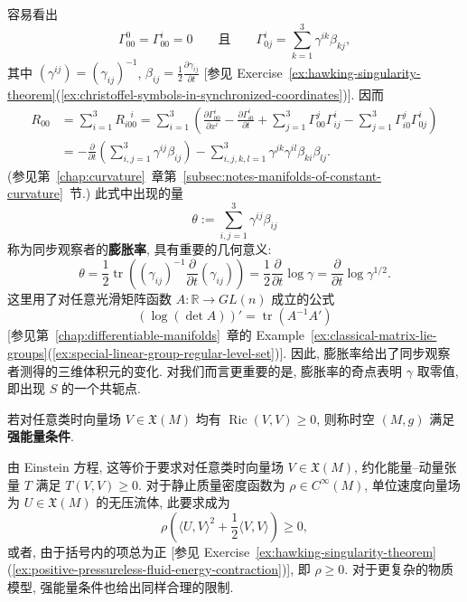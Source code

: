 容易看出
\[
  \Gamma_{00}^0=\Gamma_{00}^i=0
  \qquad\text{且}\qquad
  \Gamma_{0j}^i=\sum_{k=1}^3\gamma^{ik}\beta_{kj},
\]
其中 $(\gamma^{ij})=(\gamma_{ij})^{-1}$, $\beta_{ij}=\frac{1}{2}\frac{\partial\gamma_{ij}}{\partial t}$ [参见 Exercise~\ref{ex:hawking-singularity-theorem}(\ref{ex:christoffel-symbols-in-synchronized-coordinates})]. 因而
\begin{align*}
  R_{00}
  &=\sum_{i=1}^3R_{i00}^{\ \ \ i}
   =\sum_{i=1}^3\left(\frac{\partial\Gamma_{00}^i}{\partial x^i}
     -\frac{\partial\Gamma_{i0}^i}{\partial t}
     +\sum_{j=1}^3\Gamma_{00}^j\Gamma_{ij}^i
     -\sum_{j=1}^3\Gamma_{i0}^j\Gamma_{0j}^i\right)\\
  &=-\frac{\partial}{\partial t}\left(\sum_{i,j=1}^3\gamma^{ij}\beta_{ij}\right)
     -\sum_{i,j,k,l=1}^3\gamma^{jk}\gamma^{il}\beta_{ki}\beta_{lj}.
\end{align*}
(参见第~\ref{chap:curvature}~章第~\ref{subsec:notes-manifolds-of-constant-curvature}~节.) 此式中出现的量
\[
  \theta:=\sum_{i,j=1}^3\gamma^{ij}\beta_{ij}
\]
称为同步观察者的\textbf{膨胀率}, 具有重要的几何意义:
\[
  \theta=\frac{1}{2}\operatorname{tr}\left((\gamma_{ij})^{-1}
      \frac{\partial}{\partial t}(\gamma_{ij})\right)
  =\frac{1}{2}\frac{\partial}{\partial t}\log\gamma
  =\frac{\partial}{\partial t}\log\gamma^{1/2}.
\]
这里用了对任意光滑矩阵函数 $A:\mathbb{R}\to GL(n)$ 成立的公式
\[
  (\log(\det A))'=\operatorname{tr}(A^{-1}A')
\]
[参见第~\ref{chap:differentiable-manifolds}~章的 Example~\ref{ex:classical-matrix-lie-groups}(\ref{ex:special-linear-group-regular-level-set})]. 因此, 膨胀率给出了同步观察者测得的三维体积元的变化. 对我们而言更重要的是, 膨胀率的奇点表明 $\gamma$ 取零值, 即出现 $S$ 的一个共轭点.

\begin{RiemannDefinition}\label{def:strong-energy-condition}
若对任意类时向量场 $V\in\mathfrak{X}(M)$ 均有 $\operatorname{Ric}(V,V)\geq0$, 则称时空 $(M,g)$ 满足\textbf{强能量条件}.
\end{RiemannDefinition}

由 Einstein 方程, 这等价于要求对任意类时向量场 $V\in\mathfrak{X}(M)$, 约化能量--动量张量 $T$ 满足 $T(V,V)\geq0$. 对于静止质量密度函数为 $\rho\in C^\infty(M)$, 单位速度向量场为 $U\in\mathfrak{X}(M)$ 的无压流体, 此要求成为
\[
  \rho\left(\langle U,V\rangle^2+\frac{1}{2}\langle V,V\rangle\right)\geq0,
\]
或者, 由于括号内的项总为正 [参见 Exercise~\ref{ex:hawking-singularity-theorem}(\ref{ex:positive-pressureless-fluid-energy-contraction})], 即 $\rho\geq0$. 对于更复杂的物质模型, 强能量条件也给出同样合理的限制.

